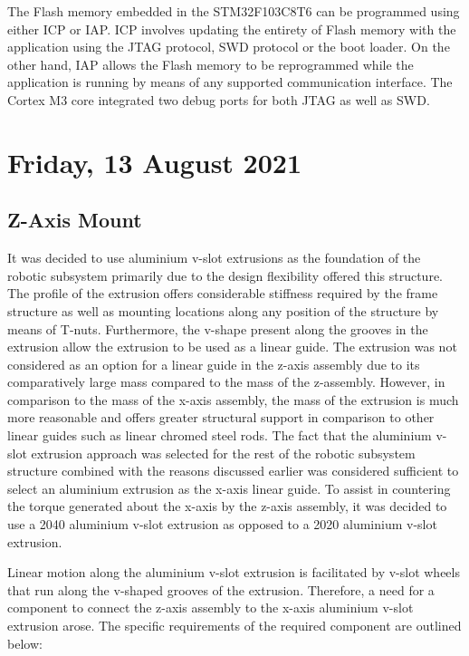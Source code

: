 The Flash memory embedded in the STM32F103C8T6 can be programmed using either \ac{ICP} or \ac{IAP}. \ac{ICP} involves updating the entirety of Flash memory with the application using the \ac{JTAG} protocol, \ac{SWD} protocol or the boot loader. On the other hand, \ac{IAP} allows the Flash memory to be reprogrammed while the application is running by means of any supported communication interface. The Cortex M3 core integrated two debug ports for both \ac{JTAG} as well as \ac{SWD}.

\pendsign

\section[2021/08/13]{Friday, 13 August 2021}

\subsection{Z-Axis Mount}

It was decided to use aluminium v-slot extrusions as the foundation of the robotic subsystem primarily due to the design flexibility offered this structure. The profile of the extrusion offers considerable stiffness required by the frame structure as well as mounting locations along any position of the structure by means of T-nuts. Furthermore, the v-shape present along the grooves in the extrusion allow the extrusion to be used as a linear guide. The extrusion was not considered as an option for a linear guide in the z-axis assembly due to its comparatively large mass compared to the mass of the z-assembly. However, in comparison to the mass of the x-axis assembly, the mass of the extrusion is much more reasonable and offers greater structural support in comparison to other linear guides such as linear chromed steel rods. The fact that the aluminium v-slot extrusion approach was selected for the rest of the robotic subsystem structure combined with the reasons discussed earlier was considered sufficient to select an aluminium extrusion as the x-axis linear guide. To assist in countering the torque generated about the x-axis by the z-axis assembly, it was decided to use a 2040 aluminium v-slot extrusion as opposed to a 2020 aluminium v-slot extrusion.

Linear motion along the aluminium v-slot extrusion is facilitated by v-slot wheels that run along the v-shaped grooves of the extrusion. Therefore, a need for a component to connect the z-axis assembly to the x-axis aluminium v-slot extrusion arose. The specific requirements of the required component are outlined below:

